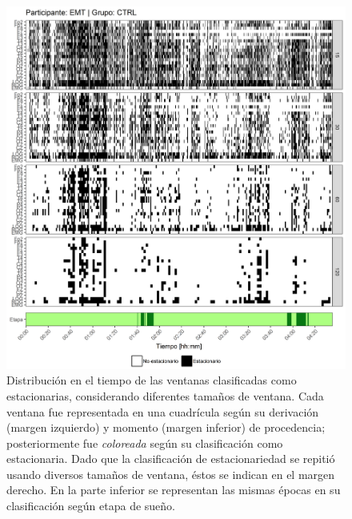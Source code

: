 \documentclass[12pt,letterpaper,draft]{book}
\begin{document}
\begin{figure}
\centering
\includegraphics[width=\linewidth]
{./scripts_graf_res/EMT_patrones_2.png}
\caption[Distribución en el tiempo de las ventanas clasificadas como estacionarias, considerando diferentes tamaños de ventana]{Distribución en el tiempo de las ventanas clasificadas como estacionarias, considerando diferentes tamaños de ventana. 
Cada ventana fue representada en una cuadrícula según su derivación (margen izquierdo) y momento (margen inferior) de procedencia; posteriormente fue \textit{coloreada} según su clasificación como estacionaria.
Dado que la clasificación de estacionariedad se repitió usando diversos tamaños de ventana, éstos se indican en el margen derecho.
En la parte inferior se representan las mismas épocas en su clasificación según etapa de sueño.}
\end{figure}
\end{document}
